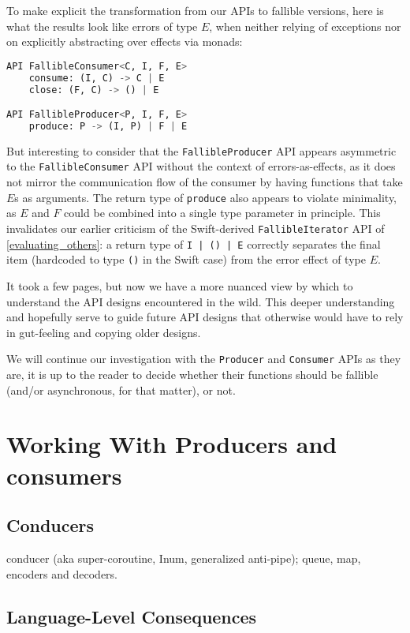 \documentclass[sigplan,screen,10pt,anonymous,review]{acmart}
\begin{document}
To make explicit the transformation from our APIs to fallible versions, here is what the results look like errors of type $E$, when neither relying of exceptions nor on explicitly abstracting over effects via monads:

\begin{lstlisting}[language=Python]
API FallibleConsumer<C, I, F, E>
    consume: (I, C) -> C | E
    close: (F, C) -> () | E

API FallibleProducer<P, I, F, E>
    produce: P -> (I, P) | F | E
\end{lstlisting}

But interesting to consider that the \texttt{FallibleProducer} API appears asymmetric to the \texttt{FallibleConsumer} API without the context of errors-as-effects, as it does not mirror the communication flow of the consumer by having functions that take $E$s as arguments. The return type of \texttt{produce} also appears to violate minimality, as $E$ and $F$ could be combined into a single type parameter in principle. This invalidates our earlier criticism of the Swift-derived \texttt{FallibleIterator} API of \cref{evaluating_others}: a return type of \texttt{I | () | E} correctly separates the final item (hardcoded to type \texttt{()} in the Swift case) from the error effect of type $E$.

It took a few pages, but now we have a more nuanced view by which to understand the API designs encountered in the wild. This deeper understanding and hopefully serve to guide future API designs that otherwise would have to rely in gut-feeling and copying older designs.

We will continue our investigation with the \texttt{Producer} and \texttt{Consumer} APIs as they are, it is up to the reader to decide whether their functions should be fallible (and/or asynchronous, for that matter), or not.

\section{Working With Producers and consumers}



\subsection{Conducers}

conducer (aka super-coroutine, Inum, generalized anti-pipe); queue, map, encoders and decoders.

\subsection{Language-Level Consequences}\label{syntax}\label{conducer}
\end{document}
